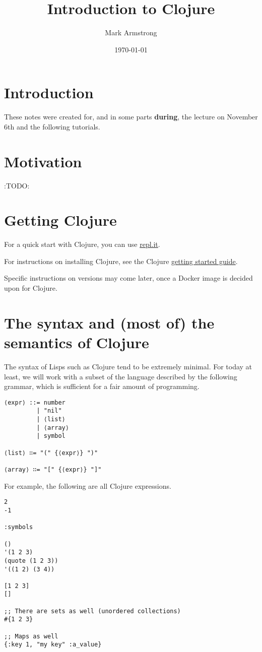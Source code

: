 \documentclass[11pt]{article}
\author{Mark Armstrong}
\date{\today}
\title{Introduction to Clojure}
\begin{document}
\maketitle
\tableofcontents


\section{Introduction}
\label{sec:org47d5093}
These notes were created for, and in some parts \textbf{during},
the lecture on November 6th and the following tutorials.

\section{Motivation}
\label{sec:orgd8a8b66}
:TODO:

\section{Getting Clojure}
\label{sec:orgbfbff03}
For a quick start with Clojure, you can use
\href{https://repl.it/languages/clojure}{repl.it}.

For instructions on installing Clojure,
see the Clojure \href{https://clojure.org/guides/getting\_started}{getting started guide}.

Specific instructions on versions may come later,
once a Docker image is decided upon for Clojure.

\section{The syntax and (most of) the semantics of Clojure}
\label{sec:org60cbe95}
The syntax of Lisps such as Clojure tend to be extremely minimal.
For today at least, we will work with a subset of the language
described by the following grammar, which is sufficient
for a fair amount of programming.
\begin{verbatim}
⟨expr⟩ ::= number
         | "nil"
         | ⟨list⟩
         | ⟨array⟩
         | symbol

⟨list⟩ ∷= "(" {⟨expr⟩} ")"

⟨array⟩ ∷= "[" {⟨expr⟩} "]"
\end{verbatim}

For example, the following are all Clojure expressions.
\begin{verbatim}
2
-1

:symbols

()
'(1 2 3)
(quote (1 2 3))
'((1 2) (3 4))

[1 2 3]
[]

;; There are sets as well (unordered collections)
#{1 2 3}

;; Maps as well
{:key 1, "my key" :a_value}
\end{verbatim}
\end{document}
